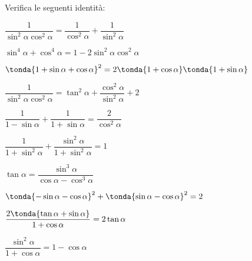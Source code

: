 \begin{esercizio}\label{ese:03.1}
Verifica le seguenti identità:
 \begin{enumeratea}
  \item $\dfrac{1}{\sin^2 \alpha \cos ^2 \alpha} = 
         \dfrac{1}{\cos ^2 \alpha} + \dfrac{1}{\sin^2 \alpha}$
  \item $\sin^4 \alpha + \cos ^4 \alpha = 1 - 2 \sin^2 \alpha \cos ^2 \alpha$
  \item $\tonda{1 + \sin \alpha + \cos \alpha}^2 =
         2 \tonda{1 + \cos \alpha} \tonda{1 + \sin \alpha}$
  \item $\dfrac{1}{\sin^2 \alpha \cos ^2 \alpha} = 
         \tan^2 \alpha + \dfrac{\cos^2 \alpha}{\sin^2 \alpha} + 2$
  \item $\dfrac{1}{1 - \sin \alpha} + \dfrac{1}{1 + \sin \alpha} =
         \dfrac{2}{\cos^2 \alpha}$
  \item $\dfrac{1}{1 + \sin^2 \alpha} + 
         \dfrac{\sin^2 \alpha}{1 + \sin^2 \alpha} = 1$
  \item $\tan \alpha =
         \dfrac{\sin^3 \alpha}{\cos \alpha - \cos^3 \alpha}$
  \item $\tonda{-\sin \alpha - \cos \alpha}^2 +
         \tonda{\sin \alpha - \cos \alpha}^2 = 2$
  \item $\dfrac{2 \tonda{\tan \alpha + \sin \alpha}}
               {1 + \cos \alpha} = 2 \tan \alpha$
  \item $\dfrac{\sin^2 \alpha}{1 + \cos \alpha} = 1 - \cos \alpha$
 \end{enumeratea}
\end{esercizio}

